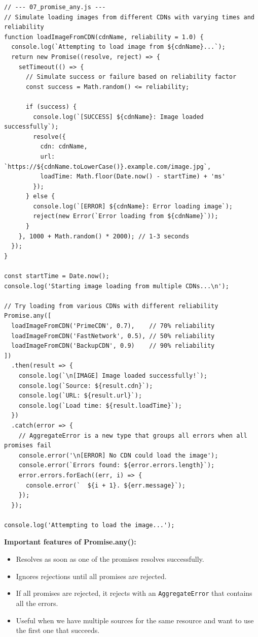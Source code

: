 \documentclass[12pt,letterpaper]{article}
\newenvironment{macterminal}{%
    \begin{mdframed}[
        linecolor=terminalFrame,
        backgroundcolor=terminalBg,
        roundcorner=5pt,
        skipabove=5pt,
        skipbelow=5pt,
        linewidth=1pt,
        innertopmargin=5pt,
        frametitle={%
            \tikz[baseline=(current bounding box.east), outer sep=0pt]{
                \fill[red!80!black] (0,0) circle (5pt);
                \fill[yellow!80!black] (0.7,0) circle (5pt);
                \fill[green!70!black] (1.4,0) circle (5pt);
            }
        },
        frametitlealignment=\raggedright,
        frametitleaboveskip=8pt,
        frametitlebelowskip=0pt,
    ]
}{%
    \end{mdframed}%
}
\begin{document}
\begin{macterminal}
\begin{lstlisting}
// --- 07_promise_any.js ---
// Simulate loading images from different CDNs with varying times and reliability
function loadImageFromCDN(cdnName, reliability = 1.0) {
  console.log(`Attempting to load image from ${cdnName}...`);
  return new Promise((resolve, reject) => {
    setTimeout(() => {
      // Simulate success or failure based on reliability factor
      const success = Math.random() <= reliability;
      
      if (success) {
        console.log(`[SUCCESS] ${cdnName}: Image loaded successfully`);
        resolve({
          cdn: cdnName,
          url: `https://${cdnName.toLowerCase()}.example.com/image.jpg`,
          loadTime: Math.floor(Date.now() - startTime) + 'ms'
        });
      } else {
        console.log(`[ERROR] ${cdnName}: Error loading image`);
        reject(new Error(`Error loading from ${cdnName}`));
      }
    }, 1000 + Math.random() * 2000); // 1-3 seconds
  });
}

const startTime = Date.now();
console.log('Starting image loading from multiple CDNs...\n');

// Try loading from various CDNs with different reliability
Promise.any([
  loadImageFromCDN('PrimeCDN', 0.7),    // 70% reliability
  loadImageFromCDN('FastNetwork', 0.5), // 50% reliability
  loadImageFromCDN('BackupCDN', 0.9)    // 90% reliability
])
  .then(result => {
    console.log(`\n[IMAGE] Image loaded successfully!`);
    console.log(`Source: ${result.cdn}`);
    console.log(`URL: ${result.url}`);
    console.log(`Load time: ${result.loadTime}`);
  })
  .catch(error => {
    // AggregateError is a new type that groups all errors when all promises fail
    console.error('\n[ERROR] No CDN could load the image');
    console.error(`Errors found: ${error.errors.length}`);
    error.errors.forEach((err, i) => {
      console.error(`  ${i + 1}. ${err.message}`);
    });
  });

console.log('Attempting to load the image...');
\end{lstlisting}
\end{macterminal}

\textbf{Important features of Promise.any():}
\begin{itemize}
    \item Resolves as soon as one of the promises resolves successfully.
    \item Ignores rejections until all promises are rejected.
    \item If all promises are rejected, it rejects with an \texttt{\textcolor{accentColor}{AggregateError}} that contains all the errors.
    \item Useful when we have multiple sources for the same resource and want to use the first one that succeeds.
\end{itemize}
\end{document}
